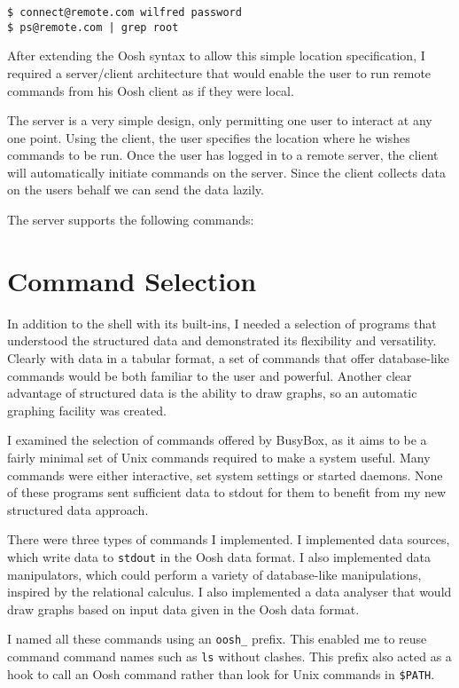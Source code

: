\documentclass[12pt,twoside,notitlepage]{report}
\begin{document}
\begin{verbatim}
$ connect@remote.com wilfred password
$ ps@remote.com | grep root
\end{verbatim}

After extending the Oosh syntax %
to allow this simple location specification, I required a server/client
architecture that would enable the user to run remote commands from his Oosh
client as if they were local.

The server is a very simple design, only permitting one user to interact at any
one point. Using the client, the user specifies the location where he wishes
commands to be run. Once the user has logged in to a remote server, the client
will automatically initiate commands on the server. Since the client collects
data on the users behalf we can send the data lazily.

The server supports the following commands:


\section{Command Selection}
In addition to the shell with its built-ins, I needed a selection of programs
that understood the structured data and demonstrated its flexibility and
versatility. Clearly with data in a tabular format, a set of commands that offer
database-like commands would be both familiar to the user and powerful. Another
clear advantage of structured data is the ability to draw graphs, so an
automatic graphing facility was created.

I examined the selection of commands offered by BusyBox, as it aims to be a
fairly minimal set of Unix commands required to make a system useful. Many
commands were either interactive, set system settings or started daemons. None
of these programs sent sufficient data to stdout for them to benefit from my
new structured data approach.

There were three types of commands I implemented. I implemented data
sources, which write data to {\tt stdout} in the Oosh data format. I
also implemented data manipulators, which could perform a variety of
database-like manipulations, inspired by the relational calculus. I
also implemented a data analyser that would draw graphs based on input
data given in the Oosh data format.

I named all these commands using an {\tt oosh\_} prefix. This enabled me
to reuse command command names such as {\tt ls} without clashes. This
prefix also acted as a hook to call an Oosh command rather than look
for Unix commands in {\tt \$PATH}.
\end{document}
